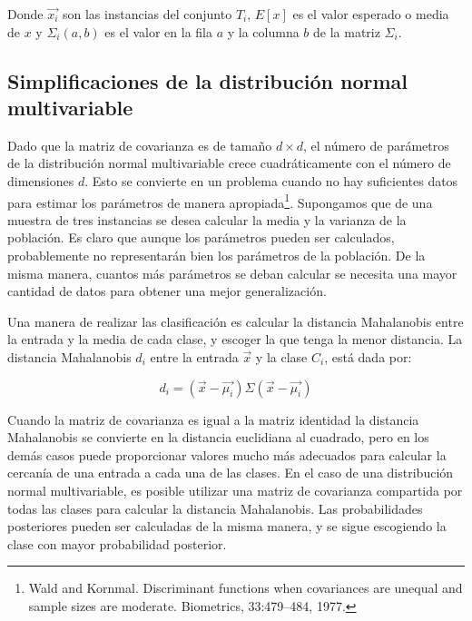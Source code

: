 \documentclass[a4paper, 11pt, oneside]{report}
\begin{document}
Donde $\vec{x_i}$ son las instancias del conjunto $T_i$, $E[x]$ es el valor esperado o media de $x$ y $\Sigma_i(a,b)$ es el valor en la fila $a$ y la columna $b$ de la matriz $\Sigma_i$.

\subsection{Simplificaciones de la distribución normal multivariable}

Dado que la matriz de covarianza es de tamaño $d \times d$, el número de parámetros de la distribución normal multivariable crece cuadráticamente con el número de dimensiones $d$. Esto se convierte en un problema cuando no hay suficientes datos para estimar los parámetros de manera apropiada\footnote{Wald and Kornmal. Discriminant functions when covariances are unequal and sample sizes are moderate. Biometrics, 33:479–484, 1977.}. Supongamos que de una muestra de tres instancias se desea calcular la media y la varianza de la población. Es claro que aunque los parámetros pueden ser calculados, probablemente no representarán bien los parámetros de la población. De la misma manera, cuantos más parámetros se deban calcular se necesita una mayor cantidad de datos para obtener una mejor generalización.

Una manera de realizar las clasificación es calcular la distancia Mahalanobis entre la entrada y la media de cada clase, y escoger la que tenga la menor distancia. La distancia Mahalanobis $d_i$ entre la entrada $\vec{x}$ y la clase $C_i$, está dada por:

	\begin{equation}
		\label{eq:mahalanobis}
		d_i = (\vec{x}-\vec{\mu_i})\Sigma(\vec{x}-\vec{\mu_i}) 
	\end{equation}

Cuando la matriz de covarianza es igual a la matriz identidad la distancia Mahalanobis se convierte en la distancia euclidiana al cuadrado, pero en los demás casos puede proporcionar valores mucho más adecuados para calcular la cercanía de una entrada a cada una de las clases. En el caso de una distribución normal multivariable, es posible utilizar una matriz de covarianza compartida por todas las clases para calcular la distancia Mahalanobis. Las probabilidades posteriores pueden ser calculadas de la misma manera, y se sigue escogiendo la clase con mayor probabilidad posterior.

\end{document}
